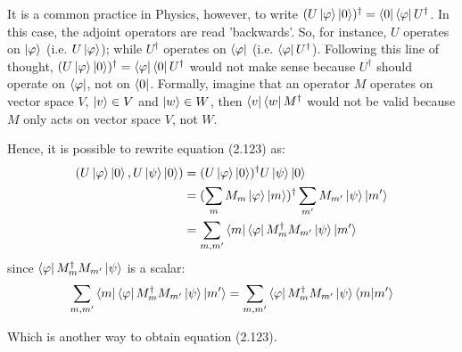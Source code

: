It is a common practice in Physics, however, to write $(U\ket{\varphi} \ket{0})^\dagger = \bra{0} \bra{\varphi} U^\dagger$. In this case, the adjoint operators are read 'backwards'. So, for instance, $U$ operates on $\ket{\varphi}$ (i.e. $U\ket{\varphi}$); while $U^\dagger$ operates on $\bra{\varphi}$ (i.e. $\bra{\varphi} U^\dagger$). Following this line of thought, $(U\ket{\varphi} \ket{0})^\dagger = \bra{\varphi} \bra{0} U^\dagger$ would not make sense because $U^\dagger$ should operate on $\bra{\varphi}$, not on $\bra{0}$. Formally, imagine that an operator $M$ operates on vector space $V$, $\ket{v} \in V$ and $\ket{w} \in W$, then $\bra{v} \bra{w} M^\dagger$ would not be valid because $M$ only acts on vector space $V$, not $W$.

Hence, it is possible to rewrite equation (2.123) as:
%
\begin{align}
    (U \ket{\varphi} \ket{0}, U \ket{\psi} \ket{0}) &= 
    (U \ket{\varphi} \ket{0})^\dagger U \ket{\psi} \ket{0}
    \\ 
    &= (\sum_m M_m \ket{\varphi} \ket{m})^\dagger \sum_{m'} M_{m'} \ket{\psi} \ket{m'}
    \\
    &= \sum_{m, m'} \bra{m} \bra{\varphi} M_m^\dagger M_{m'} \ket{\psi} \ket{m'}
\end{align}
%
since $\bra{\varphi} M_m^\dagger M_{m'} \ket{\psi}$ is a scalar:
%
\begin{align}
    \sum_{m, m'} \bra{m} \bra{\varphi} M_m^\dagger M_{m'} \ket{\psi} \ket{m'} =
    \sum_{m, m'} \bra{\varphi} M_m^\dagger M_{m'} \ket{\psi} \mathop{\mathinner{ \langle{m}|{m'}\rangle}}
\end{align}

Which is another way to obtain equation (2.123).